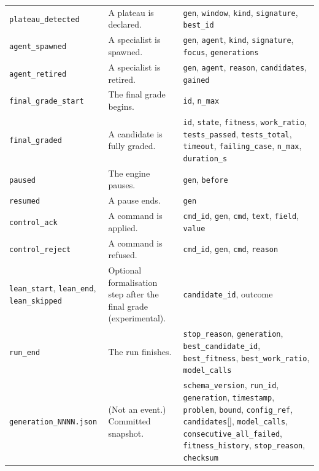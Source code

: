 \begin{longtable}{@{}p{}p{}p{}@{}}
\addlinespace[1pt]
\texttt{plateau\_detected} & A plateau is declared. & \texttt{gen}, \texttt{window}, \texttt{kind}, \texttt{signature}, \texttt{best\_id} \\
\addlinespace[1pt]
\texttt{agent\_spawned} & A specialist is spawned. & \texttt{gen}, \texttt{agent}, \texttt{kind}, \texttt{signature}, \texttt{focus}, \texttt{generations} \\
\addlinespace[1pt]
\texttt{agent\_retired} & A specialist is retired. & \texttt{gen}, \texttt{agent}, \texttt{reason}, \texttt{candidates}, \texttt{gained} \\
\addlinespace[1pt]
\texttt{final\_grade\_start} & The final grade begins. & \texttt{id}, \texttt{n\_max} \\
\addlinespace[1pt]
\texttt{final\_graded} & A candidate is fully graded. & \texttt{id}, \texttt{state}, \texttt{fitness}, \texttt{work\_ratio}, \texttt{tests\_passed}, \texttt{tests\_total}, \texttt{timeout}, \texttt{failing\_case}, \texttt{n\_max}, \texttt{duration\_s} \\
\addlinespace[1pt]
\texttt{paused} & The engine pauses. & \texttt{gen}, \texttt{before} \\
\addlinespace[1pt]
\texttt{resumed} & A pause ends. & \texttt{gen} \\
\addlinespace[1pt]
\texttt{control\_ack} & A command is applied. & \texttt{cmd\_id}, \texttt{gen}, \texttt{cmd}, \texttt{text}, \texttt{field}, \texttt{value} \\
\addlinespace[1pt]
\texttt{control\_reject} & A command is refused. & \texttt{cmd\_id}, \texttt{gen}, \texttt{cmd}, \texttt{reason} \\
\addlinespace[1pt]
\texttt{lean\_start}, \texttt{lean\_end}, \texttt{lean\_skipped} & Optional formalisation step after the final grade (experimental). & \texttt{candidate\_id}, outcome \\
\addlinespace[1pt]
\texttt{run\_end} & The run finishes. & \texttt{stop\_reason}, \texttt{generation}, \texttt{best\_candidate\_id}, \texttt{best\_fitness}, \texttt{best\_work\_ratio}, \texttt{model\_calls} \\
\addlinespace[1pt]
\texttt{generation\_NNNN.json} & (Not an event.) Committed snapshot. & \texttt{schema\_version}, \texttt{run\_id}, \texttt{generation}, \texttt{timestamp}, \texttt{problem}, \texttt{bound}, \texttt{config\_ref}, \texttt{candidates}[], \texttt{model\_calls}, \texttt{consecutive\_all\_failed}, \texttt{fitness\_history}, \texttt{stop\_reason}, \texttt{checksum} \\
\bottomrule
\end{longtable}
\endgroup


